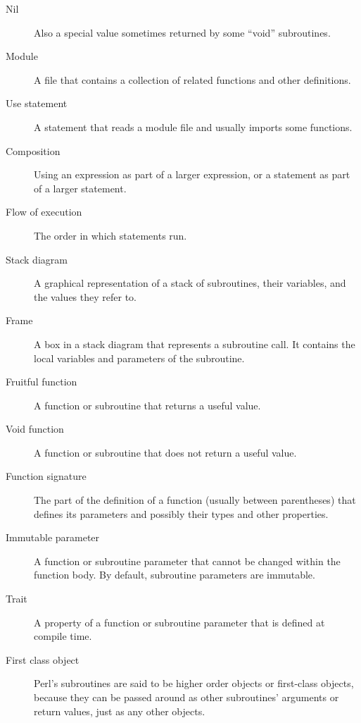 \begin{description}
\item[Nil] Also a special value sometimes returned by some 
``void'' subroutines.

\item[Module] A file that contains a
collection of related functions and other definitions.

\item[Use statement] A statement that reads a module file and usually imports some functions.

\item[Composition] Using an expression as part of a larger expression,
or a statement as part of a larger statement.

\item[Flow of execution]  The order in which statements run.

\item[Stack diagram]  A graphical representation of a stack of subroutines,
their variables, and the values they refer to.

\item[Frame]  A box in a stack diagram that represents a subroutine call.
It contains the local variables and parameters of the subroutine.

\item[Fruitful function] A function or subroutine that returns a useful value.

\item[Void function] A function or subroutine that does not 
return a useful value.

\item[Function signature] The part of the definition of a 
function (usually between parentheses) that defines its 
parameters and possibly their types and other properties.

\item[Immutable parameter] A function or subroutine parameter 
that cannot be changed within the function body. By default, 
subroutine parameters are immutable.

\item[Trait] A property of a function or subroutine parameter 
that is defined at compile time.

\item[First class object] Perl's subroutines are said to be
higher order objects or first-class objects, because they can 
be passed around as other subroutines' arguments or return values, 
just as any other objects.


\end{description}
